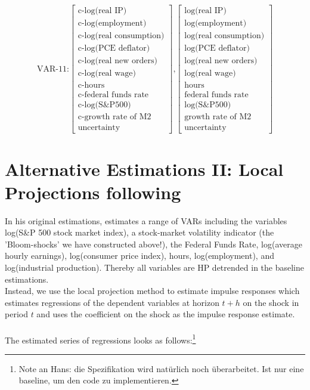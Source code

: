 \documentclass[a4paper,12pt,oneside,pointednumbers,bibtotoc,bigheadings,liststotoc]{scrbook}
\begin{document}
\begin{equation} \label{eq:VAR11}
\text{VAR-11:} \begin{bmatrix} \text{c-log(real IP)} \\ 
				      \text{c-log(employment)}\\ 
				      \text{c-log(real consumption)}\\
				      \text{c-log(PCE deflator)}\\
				      \text{c-log(real new orders)}\\
				      \text{c-log(real wage)}\\
				      \text{c-hours}\\
				      \text{c-federal funds rate}\\
				      \text{c-log(S\&P500)}\\
				      \text{c-growth rate of M2}\\
				      \text{uncertainty}
	      \end{bmatrix}\text{,}
	      \begin{bmatrix} \text{log(real IP)} \\ 
				      \text{log(employment)}\\ 
				      \text{log(real consumption)}\\
				      \text{log(PCE deflator)}\\
				      \text{log(real new orders)}\\
				      \text{log(real wage)}\\
				      \text{hours}\\
				      \text{federal funds rate}\\
				      \text{log(S\&P500)}\\
				      \text{growth rate of M2}\\
				      \text{uncertainty}
	      \end{bmatrix}
\end{equation}


\section{Alternative Estimations II: Local Projections following \citet{jorda:05}}
In his original estimations, \citet{bloom:09} estimates a range of VARs including the variables log(S\&P 500 stock market index), a stock-market volatility indicator (the 'Bloom-shocks' we have constructed above!), the Federal Funds Rate, log(average hourly earnings), log(consumer price index), hours, log(employment), and log(industrial production). Thereby all variables are HP detrended in the baseline estimations.\\
Instead, we use the \citet{jorda:05} local projection method to estimate impulse responses which estimates regressions of the dependent variables at horizon $t+h$ on the shock in period $t$ and uses the coefficient on the shock as the impulse response estimate.
\\
\\
The estimated series of regressions looks as follows:\footnote{Note an Hans: die Spezifikation wird natürlich noch überarbeitet. Ist nur eine baseline, um den code zu implementieren.}
\end{document}
